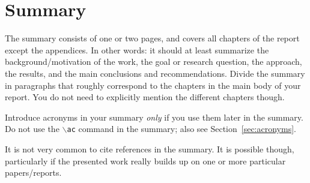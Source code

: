 \chapter{Summary}
\pagestyle{headings}

The summary consists of one or two pages, and covers all chapters of the report except the appendices. In other words: it should at least summarize the back\-ground/moti\-vation of the work, the goal or research question, the approach, the results, and the main conclusions and recommendations. Divide the summary in paragraphs that roughly correspond to the chapters in the main body of your report. You do not need to explicitly mention the different chapters though.

Introduce acronyms in your summary \emph{only} if you use them later in the summary. Do not use the \texttt{$\backslash$ac} command in the summary; also see Section~\ref{sec:acronyms}.

It is not very common to cite references in the summary. It is possible though, particularly if the presented work really builds up on one or more particular papers/reports.